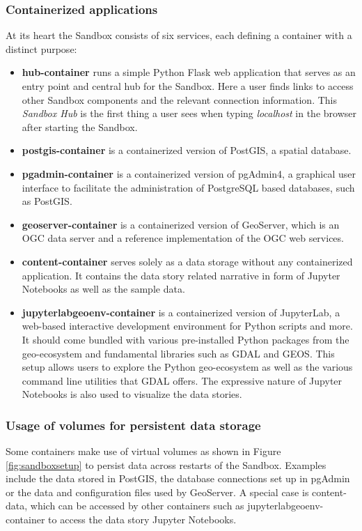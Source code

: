 \documentclass[11pt, a4paper, oneside, parskip=full-]{scrartcl}
\begin{document}
\subsubsection*{Containerized applications}
At its heart the Sandbox consists of six services, each defining a container
with a distinct purpose:

\begin{itemize}
  \item \textbf{hub-container} runs a simple Python Flask\cite{flask} web
  application that serves as an entry point and central hub for the Sandbox.
  Here a user finds links to access other Sandbox components and the relevant
  connection information. This \emph{Sandbox Hub} is the first thing a user sees
  when typing \emph{localhost} in the browser after starting the Sandbox.
  \item \textbf{postgis-container} is a containerized version of PostGIS, a
  spatial database.
  \item \textbf{pgadmin-container} is a containerized version of pgAdmin4, a
  graphical user interface to facilitate the administration of PostgreSQL based
  databases, such as PostGIS.
  \item \textbf{geoserver-container} is a containerized version of GeoServer,
  which is an OGC data server and a reference implementation of the OGC web
  services.
  \item \textbf{content-container} serves solely as a data storage without any
  containerized application. It contains the data story related narrative in
  form of Jupyter Notebooks as well as the sample data.
  \item \textbf{jupyterlabgeoenv-container} is a containerized version of
  JupyterLab, a web-based interactive development environment for Python scripts
  and more. It should come bundled with various pre-installed Python packages
  from the geo-ecosystem and fundamental libraries such as GDAL and
  GEOS\cite{geos}. This setup allows users to explore the Python geo-ecosystem
  as well as the various command line utilities that GDAL offers. The expressive
  nature of Jupyter Notebooks is also used to visualize the data stories.
\end{itemize}

\subsubsection*{Usage of volumes for persistent data storage}
Some containers make use of virtual volumes as shown in Figure
\ref{fig:sandboxsetup} to persist data across restarts of the Sandbox. Examples
include the data stored in PostGIS, the database connections set up in pgAdmin
or the data and configuration files used by GeoServer. A special case is
content-data, which can be accessed by other containers such as
jupyterlabgeoenv-container to access the data story Jupyter Notebooks.
\end{document}
